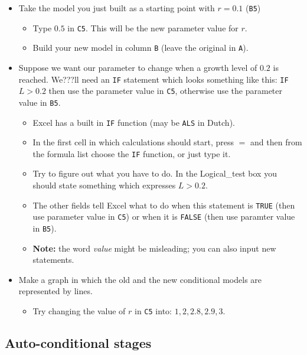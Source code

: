\documentclass[]{book}
\providecommand{\tightlist}{%
  \setlength{\itemsep}{0pt}\setlength{\parskip}{0pt}}
\begin{document}
\begin{itemize}
\tightlist
\item
  Take the model you just built as a starting point with \(r = 0.1\)
  (\texttt{B5})

  \begin{itemize}
  \tightlist
  \item
    Type \(0.5\) in \texttt{C5}. This will be the new parameter value
    for \(r\).
  \item
    Build your new model in column \texttt{B} (leave the original in
    \texttt{A}).
  \end{itemize}
\item
  Suppose we want our parameter to change when a growth level of \(0.2\)
  is reached. We???ll need an \texttt{IF} statement which looks
  something like this: \texttt{IF} \(L > 0.2\) then use the parameter
  value in \texttt{C5}, otherwise use the parameter value in
  \texttt{B5}.

  \begin{itemize}
  \tightlist
  \item
    Excel has a built in \texttt{IF} function (may be \texttt{ALS} in
    Dutch).
  \item
    In the first cell in which calculations should start, press \(=\)
    and then from the formula list choose the \texttt{IF} function, or
    just type it.
  \item
    Try to figure out what you have to do. In the Logical\_test box you
    should state something which expresses \(L > 0.2\).
  \item
    The other fields tell Excel what to do when this statement is
    \texttt{TRUE} (then use parameter value in \texttt{C5}) or when it
    is \texttt{FALSE} (then use paramter value in \texttt{B5}).
  \item
    \textbf{Note:} the word \emph{value} might be misleading; you can
    also input new statements.
  \end{itemize}
\item
  Make a graph in which the old and the new conditional models are
  represented by lines.

  \begin{itemize}
  \tightlist
  \item
    Try changing the value of \(r\) in \texttt{C5} into:
    \(1, 2, 2.8, 2.9, 3\).
  \end{itemize}
\end{itemize}

\subsection*{Auto-conditional stages}\label{auto-conditional-stages}
\end{document}
